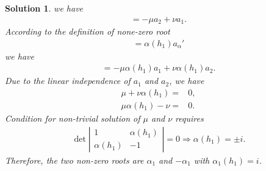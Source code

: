 \documentclass[UTF8,10pt,a4paper]{article}
\theoremstyle{Problem}
\theoremstyle{Solution}
\newtheorem*{sol}{Solution}
\begin{document}
\begin{sol}
    we have
    \begin{align}
        [h_1,a_{\alpha}']=-\mu a_2+\nu a_1.
    \end{align}
    According to the definition of none-zero root
    \begin{align}
        [h_1,a_{\alpha}']=\alpha(h_1)a_{\alpha}'
    \end{align}
    we have
    \begin{align}
        [h_1,a_{\alpha}']=-\mu\alpha(h_1)a_1+\nu\alpha(h_1)a_2.
    \end{align}
    Due to the linear independence of $a_1$ and $a_2$, we have
    \begin{align}
        \mu+\nu\alpha(h_1)=&0,\\
        \mu\alpha(h_1)-\nu=&0.
    \end{align}
    Condition for non-trivial solution of $\mu$ and $\nu$ requires
    \begin{align}
        \det\left\lvert\begin{matrix}
            1&\alpha(h_1)\\
            \alpha(h_1)&-1
        \end{matrix}\right\rvert=0\Longrightarrow\alpha(h_1)=\pm i.
    \end{align}
    Therefore, the two non-zero roots are $\alpha_1$ and $-\alpha_1$ with $\alpha_1(h_1)=i$.
\end{sol}
\end{document}
